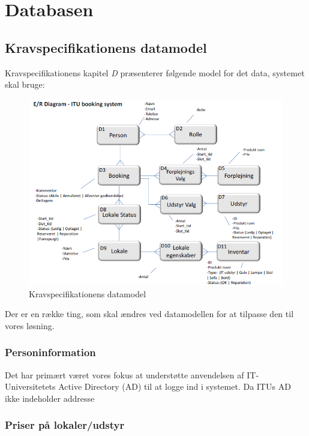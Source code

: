 \section{Databasen}
\label{Technical_Database}

\subsection{Kravspecifikationens datamodel}
\label{Technical_Database_ks}
Kravspecifikationens kapitel \textit{D} \cite[s.14]{kravspec} præsenterer følgende model for det data, systemet skal bruge:
\begin{figure}[h!]
  \centering
    \includegraphics[width=\textwidth]{Chapters/Design/Technical/Images/KSdata}
  \caption{Kravspecifikationens datamodel}
\label{Fig:Technical_Database_ks_KSdata}
\end{figure}

Der er en række ting, som skal ændres ved datamodellen for at tilpasse den til vores løsning. 

\subsubsection{Personinformation}
\label{Technical_Database_ks_personinfo}
Det har primært været vores fokus at understøtte anvendelsen af IT-Universitetets Active Directory (AD) til at logge ind i systemet. Da ITUs AD ikke indeholder addresse

\subsubsection{Priser på lokaler/udstyr}
\label{Technical_Database_ks_prices}

